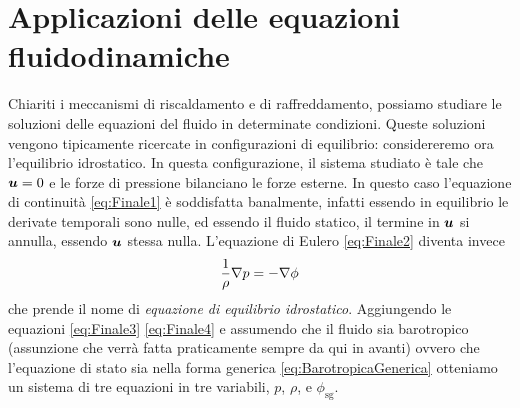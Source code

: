 \section{Applicazioni delle equazioni fluidodinamiche}
Chiariti i meccanismi di riscaldamento e di raffreddamento, possiamo studiare le soluzioni delle equazioni del fluido in determinate condizioni. Queste soluzioni vengono tipicamente ricercate in configurazioni di equilibrio: considereremo ora l'equilibrio idrostatico. In questa configurazione, il sistema studiato è tale che $\V{u}=0$ e le forze di pressione bilanciano le forze esterne. In questo caso l'equazione di continuità \ref{eq:Finale1} è soddisfatta banalmente, infatti essendo in equilibrio le derivate temporali sono nulle, ed essendo il fluido statico, il termine in $\V{u}$ si annulla, essendo $\V{u}$ stessa nulla. L'equazione di Eulero \ref{eq:Finale2} diventa invece
\begin{equation}
\frac{1}{\rho} \V{\nabla}p= -\V{\nabla}\phi \label{eq:EquilibrioIdrostatico}
\end{equation}
che prende il nome di \textit{equazione di equilibrio idrostatico}. Aggiungendo le equazioni \ref{eq:Finale3} \ref{eq:Finale4} e assumendo che il fluido sia barotropico (assunzione che verrà fatta praticamente sempre da qui in avanti) ovvero che l'equazione di stato sia nella forma generica \ref{eq:BarotropicaGenerica} otteniamo un sistema di tre equazioni in tre variabili, $p$, $\rho$, e $\phi_\mathrm{sg}$.

